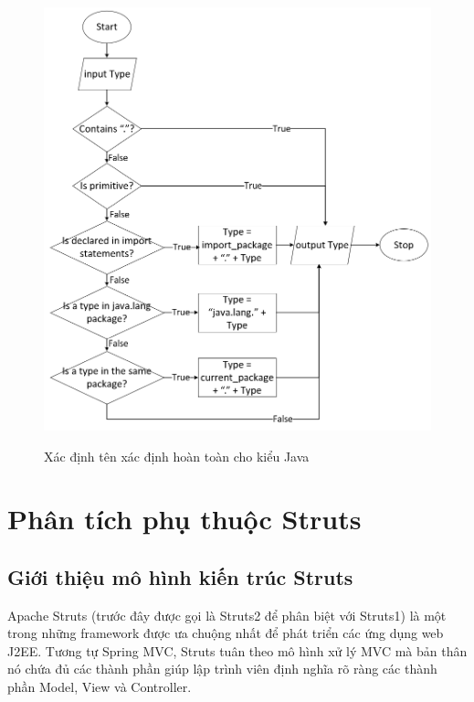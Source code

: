 \documentclass[12pt]{report}
\begin{document}
\begin{figure}[h]
	\centering
	\includegraphics[scale=0.6]{fqn-type}
	\label{fig:fqn-type}
	\caption{Xác định tên xác định hoàn toàn cho kiểu Java}
\end{figure}

\section{Phân tích phụ thuộc Struts}
\subsection{Giới thiệu mô hình kiến trúc Struts}
Apache Struts (trước đây được gọi là Struts2 để phân biệt với Struts1) là một trong những framework được ưa chuộng nhất để phát triển các ứng dụng web J2EE. Tương tự Spring MVC, Struts tuân theo mô hình xử lý MVC mà bản thân nó chứa đủ các thành phần giúp lập trình viên định nghĩa rõ ràng các thành phần Model, View và Controller.
\end{document}

